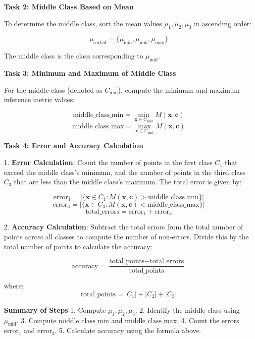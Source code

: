 \textbf{Task 2: Middle Class Based on Mean}

To determine the middle class, sort the mean values \( \mu_1, \mu_2, \mu_3 \) in ascending order:

\[
\mu_{\text{sorted}} = \{\mu_{\text{min}}, \mu_{\text{mid}}, \mu_{\text{max}}\}
\]

The middle class is the class corresponding to \( \mu_{\text{mid}} \).

\textbf{Task 3: Minimum and Maximum of Middle Class}

For the middle class (denoted as \( C_{\text{mid}} \)), compute the minimum and maximum inference metric values:

\[
\text{middle\_class\_min} = \min_{\mathbf{x} \in C_{\text{mid}}} M(\mathbf{x}, \mathbf{c})
\]
\[
\text{middle\_class\_max} = \max_{\mathbf{x} \in C_{\text{mid}}} M(\mathbf{x}, \mathbf{c})
\]

\textbf{Task 4: Error and Accuracy Calculation}

1. \textbf{Error Calculation}: Count the number of points in the first class \( C_1 \) that exceed the middle class's minimum, and the number of points in the third class \( C_3 \) that are less than the middle class's maximum. The total error is given by:

\[
\text{error}_1 = \left| \{\mathbf{x} \in C_1 : M(\mathbf{x}, \mathbf{c}) > \text{middle\_class\_min} \} \right|
\]
\[
\text{error}_3 = \left| \{\mathbf{x} \in C_3 : M(\mathbf{x}, \mathbf{c}) < \text{middle\_class\_max} \} \right|
\]
\[
\text{total\_errors} = \text{error}_1 + \text{error}_3
\]

2. \textbf{Accuracy Calculation}: Subtract the total errors from the total number of points across all classes to compute the number of non-errors. Divide this by the total number of points to calculate the accuracy:

\[
\text{accuracy} = \frac{\text{total\_points} - \text{total\_errors}}{\text{total\_points}}
\]

where:
\[
\text{total\_points} = |C_1| + |C_2| + |C_3|
\]

\textbf{Summary of Steps}
1. Compute \( \mu_1, \mu_2, \mu_3 \).
2. Identify the middle class using \( \mu_{\text{mid}} \).
3. Compute \( \text{middle\_class\_min} \) and \( \text{middle\_class\_max} \).
4. Count the errors \( \text{error}_1 \) and \( \text{error}_3 \).
5. Calculate accuracy using the formula above.













